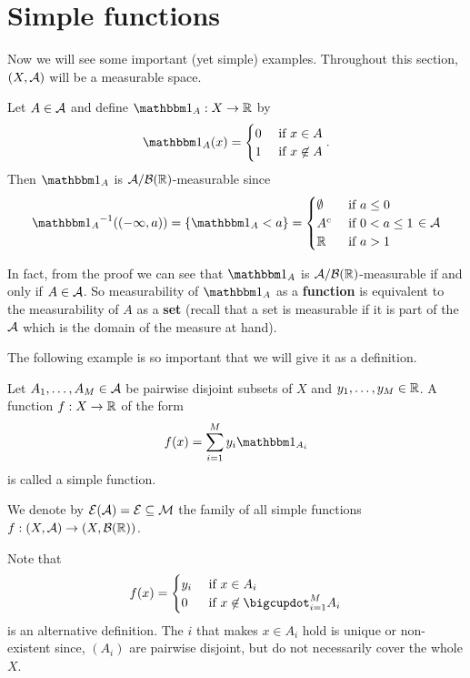 \section{Simple functions}

Now we will see some important (yet simple) examples. Throughout this section, $(X, \mathcal{A})$ will be a measurable space.

\begin{eg}
	Let $A \in \mathcal{A}$ and define $\ind_A : X \to \R$ by
	\begin{align*}
		\ind_A(x) = \begin{cases}
		0 \tif x \in A\\
		1 \tif x \not\in A
		\end{cases}.
	\end{align*}
	Then $\ind_A$ is $\mathcal{A}/\mathcal{B}(\mathbb{R})$-measurable since
	\begin{align*}
		\inv{\ind_A}((-\infty, a)) = \{\ind_A < a\} = \begin{cases}
		\emptyset \tif a \leq 0\\
		A^\complement \tif 0 < a \leq 1\\
		\R \tif a > 1
		\end{cases} \in \sa
	\end{align*}
	
	In fact, from the proof we can see that $\ind_A$ is $\mathcal{A}/\mathcal{B}(\mathbb{R})$-measurable if and only if $A \in \mathcal{A}$. So measurability of $\ind_A$ as a \textbf{function} is equivalent to the measurability of $A$ as a \textbf{set} (recall that a set is measurable if it is part of the $\mathcal{A}$ which is the domain of the measure at hand).
\end{eg}

The following example is so important that we will give it as a definition.

\begin{dfn}
	Let $A_1, \dots, A_M \in \mathcal{A}$ be pairwise disjoint subsets of $X$ and $y_1, \dots, y_M \in\mathbb{R}$. A function $f: X \to \mathbb{R}$ of the form
	\begin{align*}
		f(x) = \sum_{i = 1}^M y_i \ind_{A_i}
	\end{align*}
	is called a simple function. 
	
	We denote by $\mathcal{E}(\mathcal{A}) = \mathcal{E} \subseteq \mathcal{M}$ the family of all simple functions $f:(X,\mathcal{A}) \to (X, \mathcal{B}(\mathbb{R}))$.
\end{dfn}

Note that
\begin{align*}
	f(x) = \begin{cases}
	y_i \tif x \in A_i \\
	0 \tif x \not\in \bigcupdot_{i = 1}^M A_i
	\end{cases}
\end{align*}
is an alternative definition. The $i$ that makes $x \in A_i$ hold is unique or non-existent since, $(A_i)$ are pairwise disjoint, but do not necessarily cover the whole $X$.

